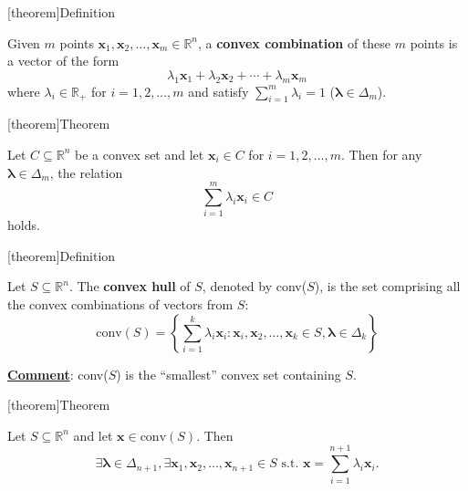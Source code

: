 \documentclass[12pt]{report}
\theoremstyle{definition}
\begin{document}
[theorem]{Definition}
\begin{convex combinations}
    Given $m$ points
    $\mathbf{x}_1,\mathbf{x}_2,\ldots,\mathbf{x}_m\in\mathbb{R}^{n}$, a
    \textbf{convex combination} of these $m$ points is a vector of the form 
    \[
        \lambda_1\mathbf{x}_1+\lambda_2\mathbf{x}_2+\cdots+\lambda_m\mathbf{x}_m
    \]
    where $\lambda_i\in\mathbb{R}_+$ for $i=1,2,\ldots,m$ and satisfy
    $\sum_{i=1}^m\lambda_i=1$ ($\pmb{\lambda}\in\Delta_m$).
\end{convex combinations}

[theorem]{Theorem}
\begin{convex combination is convex}
    Let $C\subseteq\mathbb{R}^{n}$ be a convex set and let $\mathbf{x}_i\in C$
    for $i=1,2,\ldots,m$. Then for any $\pmb{\lambda}\in\Delta_m$, the relation
    \[
        \sum_{i=1}^{m} \lambda_i \mathbf{x}_i\in C
    \]
    holds.
\end{convex combination is convex}


[theorem]{Definition}
\begin{convex hull}
    Let $S\subseteq\mathbb{R}^{n}$. The \textbf{convex hull} of $S$, denoted by
    conv($S$), is the set comprising all the convex combinations of vectors from
    $S$:
    \[
        \text{conv}(S)=\left\{\sum_{i=1}^{k} \lambda_i\mathbf{x}_i:
        \mathbf{x}_i,\mathbf{x}_2,\ldots,\mathbf{x}_k\in S,\pmb{\lambda}\in\Delta_k\right\}
    \]
\end{convex hull}
\underline{\textbf{Comment}}: conv($S$) is the ``smallest'' convex set
containing $S$.

[theorem]{Theorem}
\begin{caratheodory}
    Let $S\subseteq\mathbb{R}^{n}$ and let $\mathbf{x}\in\text{conv}(S)$. Then
    \[
        \exists\pmb{\lambda}\in\Delta_{n+1},
        \exists\mathbf{x}_1,\mathbf{x}_2,\ldots,\mathbf{x}_{n+1}\in S
        \text{ s.t. }
        \mathbf{x}=\sum_{i=1}^{n+1} \lambda_i\mathbf{x}_i.
    \]
\end{caratheodory}
\end{document}
